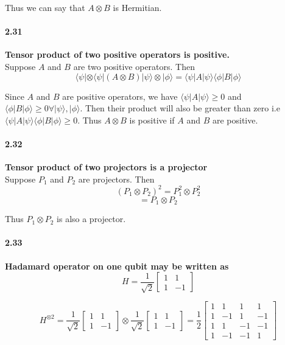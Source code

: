 Thus we can say that $A \otimes B$ is Hermitian.

\paragraph{2.31} \textbf{Tensor product of two positive operators is positive.}%
\\
Suppose $A$ and $B$ are two positive operators. Then
$$ \langle \psi | \otimes \langle \psi| ( A \otimes B) | \psi\rangle \otimes | \phi\rangle = \langle \psi|A|\psi\rangle \langle \phi |B|\phi\rangle$$

Since $A$ and $B$ are positive operators, we have $\langle \psi|A|\psi\rangle \ge 0$ and $\langle \phi|B|\phi\rangle \ge 0 \forall |\psi\rangle , |\phi\rangle$. Then their product will also be greater than zero i.e $\langle \psi|A|\psi\rangle \langle \phi|B|\phi\rangle \ge 0$. Thus $A \otimes B$ is positive if $A$ and $B$ are positive.

\paragraph{2.32} \textbf{Tensor product of two projectors is a projector}%
\\

Suppose $P_1$ and $P_2$ are projectors. Then
$$ (P_1 \otimes P_2)^2 = P_1^2 \otimes P_2^2$$
$$ = P_1 \otimes P_2$$

Thus $P_1 \otimes P_2$ is also a projector.

\paragraph{2.33} \textbf{Hadamard operator on one qubit may be written as}%
\\
$$ H = \frac{1}{\sqrt{2}} \begin{bmatrix}
    1 & 1 \\ 1 & -1
\end{bmatrix}$$

$$ H^{\otimes 2} = \frac{1}{\sqrt{2}} \begin{bmatrix}
    1 & 1 \\ 1 & -1
\end{bmatrix} \otimes \frac{1}{\sqrt{2}} \begin{bmatrix}
    1 & 1 \\ 1 & -1
\end{bmatrix} = \frac{1}{2}\begin{bmatrix}
    1 & 1 & 1 & 1 \\
    1 & -1 & 1 & -1 \\
    1 & 1 & -1 & -1 \\
    1 & -1 & -1 & 1
\end{bmatrix}$$

